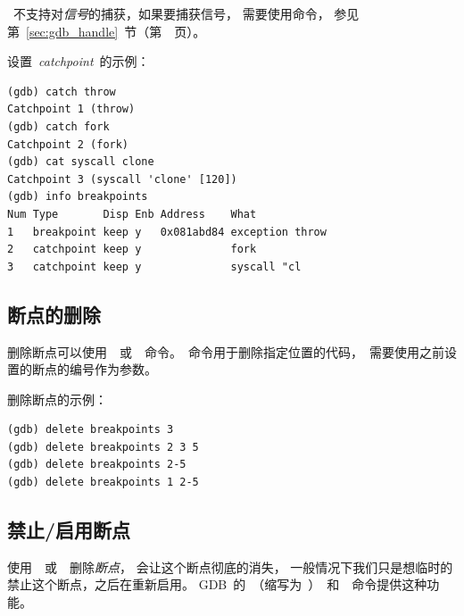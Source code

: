 ~不支持对\emph{信号}的捕获，如果要捕获信号，
需要使用命令，
参见第~\ref{sec:gdb_handle}~节（第~\pageref{sec:gdb_handle}~页）。

设置~\emph{catchpoint}~的示例：
\begin{lstlisting}
(gdb) catch throw
Catchpoint 1 (throw)
(gdb) catch fork
Catchpoint 2 (fork)
(gdb) cat syscall clone
Catchpoint 3 (syscall 'clone' [120])
(gdb) info breakpoints
Num Type       Disp Enb Address    What
1   breakpoint keep y   0x081abd84 exception throw
2   catchpoint keep y              fork
3   catchpoint keep y              syscall "cl
\end{lstlisting}

\subsection{断点的删除}
删除断点可以使用~~或~~命令。~命令用于删除指定位置的代码，~需要使用之前设置的断点的编号作为参数。

\noindent
{}


\noindent
{}


删除断点的示例：
\begin{lstlisting}
(gdb) delete breakpoints 3
(gdb) delete breakpoints 2 3 5
(gdb) delete breakpoints 2-5
(gdb) delete breakpoints 1 2-5
\end{lstlisting}

\subsection{禁止/启用断点}

使用~~或~~删除\emph{断点}，
会让这个断点彻底的消失，
一般情况下我们只是想临时的禁止这个断点，之后在重新启用。
GDB~的~（缩写为~）~和~~命令提供这种功能。

